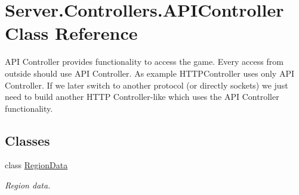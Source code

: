 \hypertarget{classServer_1_1Controllers_1_1APIController}{}\section{Server.\+Controllers.\+A\+P\+I\+Controller Class Reference}
\label{classServer_1_1Controllers_1_1APIController}


A\+P\+I Controller provides functionality to access the game. Every access from outside should use A\+P\+I Controller. As example H\+T\+T\+P\+Controller uses only A\+P\+I Controller. If we later switch to another protocol (or directly sockets) we just need to build another H\+T\+T\+P Controller-\/like which uses the A\+P\+I Controller functionality.  


\subsection*{Classes}
\begin{DoxyCompactItemize}
\item 
class \hyperlink{classServer_1_1Controllers_1_1APIController_1_1RegionData}{Region\+Data}
\begin{DoxyCompactList}\small\item\em Region data. \end{DoxyCompactList}\end{DoxyCompactItemize}
